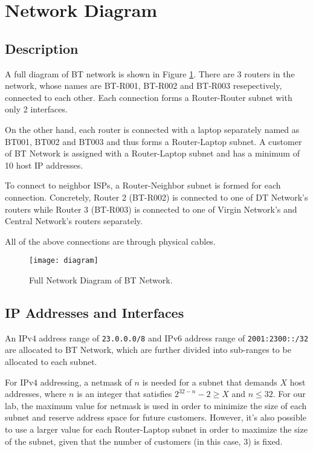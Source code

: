 \section{Network Diagram}
\label{sec:diagram}

\subsection{Description}

A full diagram of BT network is shown in Figure \ref{fig:diagram}.
There are 3 routers in the network, whose names are BT-R001, BT-R002 and BT-R003 resepectively, connected to each other. 
Each connection forms a Router-Router subnet with only 2 interfaces.

On the other hand, each router is connected with a laptop separately named as BT001, BT002 and BT003 and thus forms a Router-Laptop subnet.
A customer of BT Network is assigned with a Router-Laptop subnet and has a minimum of 10 host IP addresses.

To connect to neighbor ISPs, a Router-Neighbor subnet is formed for each connection. Concretely, Router 2 (BT-R002) is connected to one of DT Network's routers while Router 3 (BT-R003) is connected to one of Virgin Network's and Central Network's routers separately.

All of the above connections are through physical cables.

\begin{landscape}
\begin{figure}[t!]
    \centering
    \texttt{[image: diagram]}
    \caption{Full Network Diagram of BT Network.}
    \label{fig:diagram}
\end{figure}
\end{landscape}




\subsection{IP Addresses and Interfaces}

An IPv4 address range of \texttt{23.0.0.0/8} and IPv6 address range of \texttt{2001:2300::/32} are allocated to BT Network, which are further divided into sub-ranges to be allocated to each subnet.

For IPv4 addressing, a netmask of $n$ is needed for a subnet that demands $X$ host addresses, where $n$ is an integer that satisfies $2^{32-n} - 2 \geq X$ and $n \leq 32$. For our lab, the maximum value for netmask is used in order to minimize the size of each subnet and reserve address space for future customers. However, it's also possible to use a larger value for each Router-Laptop subnet in order to maximize the size of the subnet, given that the number of customers (in this case, $3$) is fixed.

